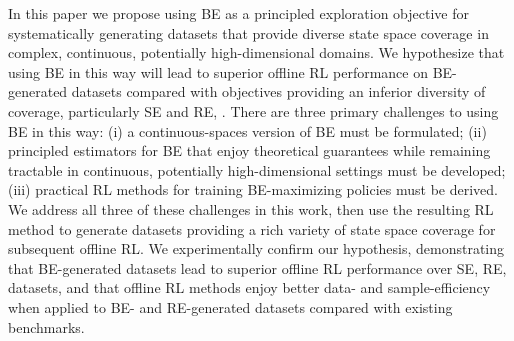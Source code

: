 In this paper we propose using BE as a principled exploration objective for systematically generating datasets that provide diverse state space coverage in complex, continuous, potentially high-dimensional domains. We hypothesize that using BE in this way will lead to superior offline RL performance on BE-generated datasets compared with objectives providing an inferior diversity of coverage, particularly SE and RE, . There are three primary challenges to using BE in this way: (i) a continuous-spaces version of BE must be formulated; (ii) principled estimators for BE that enjoy theoretical guarantees while remaining tractable in continuous, potentially high-dimensional settings must be developed; (iii) practical RL methods for training BE-maximizing policies must be derived. We address all three of these challenges in this work, then use the resulting RL method to generate datasets providing a rich variety of state space coverage for subsequent offline RL. We experimentally confirm our hypothesis, demonstrating that BE-generated datasets lead to superior offline RL performance over SE, RE,  datasets, and that offline RL methods enjoy better data- and sample-efficiency when applied to BE- and RE-generated datasets compared with existing benchmarks.
%
%
%
